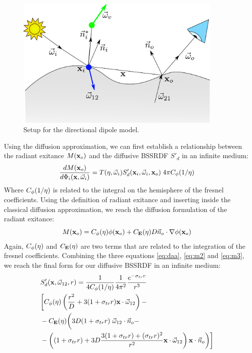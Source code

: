 \begin{figure}[!ht]
\centering
\includegraphics[width=0.9\textwidth]{images/jeppe.pdf}
\caption{Setup for the directional dipole model.}
\label{fig:jeppe}
\end{figure}

Using the diffusion approximation, we can first establish a relationship between the radiant exitance $M(\mathbf{x}_o)$ and the diffusive BSSRDF $S'_d$ in an infinite medium:
\begin{equation}
\frac{d M(\mathbf{x}_o)}{d \Phi_i(\mathbf{x}, \vec{\omega}_i)} = T(\eta, \vec{\omega}_i) S'_d(\mathbf{x}_i, \vec{\omega}_i, \mathbf{x}_o) \; 4\pi C_{\phi}(1/\eta) 
\label{eq:m2}
\end{equation}
Where $C_{\phi}(1/\eta)$ is related to the integral on the hemisphere of the fresnel coefficients. Using the definition of radiant exitance and inserting inside the classical diffusion approximation, we reach the diffusion formulation of the radiant exitance:
\begin{equation}
M(\mathbf{x}_o) = C_{\phi}(\eta) \phi(\mathbf{x}_o) + C_{\mathbf{E}}(\eta) D \vec{n}_o \cdot \nabla \phi(\mathbf{x}_o)
\label{eq:m3}
\end{equation}
Again, $C_{\phi}(\eta)$ and $C_{\mathbf{E}}(\eta)$ are two terms that are related to the integration of the fresnel coefficients. Combining the three equations \ref{eq:daa}, \ref{eq:m2} and \ref{eq:m3}, we reach the final form for our diffusive BSSRDF in an infinite medium:
\begin{equation}
\begin{split}
&S'_d(\mathbf{x}, \vec{\omega}_{12}, r) = \frac{1}{4C_{\phi}(1/\eta)} \frac{1}{4\pi^2} \frac{e^{-\sigma_{tr} r}}{r^3} \\
&\bigg[ C_{\phi}(\eta) \left(\frac{r^2}{D} + 3 (1 + \sigma_{tr} r ) \mathbf{x} \cdot \vec{\omega}_{12} \right) - \\
&-C_{\mathbf{E}}(\eta) \bigg(3D (1 + \sigma_{tr} r) \; \vec{\omega}_{12} \cdot \vec{n}_o - \\ 
&-\left( (1 + \sigma_{tr} r) + 3D \frac{3(1 + \sigma_{tr} r ) + (\sigma_{tr} r)^2}{r^2}  \mathbf{x} \cdot \vec{\omega}_{12} \right)  \mathbf{x} \cdot \vec{n}_o \bigg) \bigg] 
\end{split}
\label{eq:dirdipole}
\end{equation}

